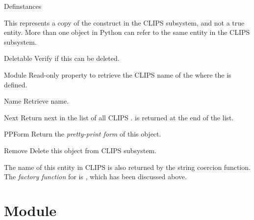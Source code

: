 \begin{classdesc*}{Definstances}

This represents a copy of the  construct in the CLIPS
subsystem, and not a true  entity. More than one
 object in Python can refer to the same
 entity in the CLIPS subsystem.

\begin{memberdesc}[property]{Deletable}
Verify if this  can be deleted.
\end{memberdesc}

\begin{memberdesc}[property]{Module}
Read-only property to retrieve the CLIPS name of the 
where the  is defined.
\end{memberdesc}

\begin{memberdesc}[property]{Name}
Retrieve  name.
\end{memberdesc}

\begin{methoddesc}{Next}{}
Return next  in the list of all CLIPS
.  is returned at the end of the list.
\end{methoddesc}

\begin{methoddesc}{PPForm}{}
Return the \emph{pretty-print form} of this  object.
\end{methoddesc}

\begin{methoddesc}{Remove}{}
Delete this  object from CLIPS subsystem.
\end{methoddesc}

The name of this entity in CLIPS is also returned by the string coercion
function. The \emph{factory function} for  is
, which has been discussed above.

\end{classdesc*}



\section{Module\label{pyclips-cl-Module}}

